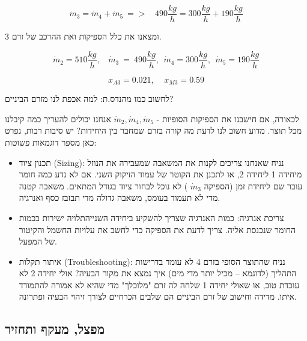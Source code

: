 \documentclass[
  hebrew,
  letterpaper,
  DIV=11,
  numbers=noendperiod]{scrreprt}
\begin{document}
\[{\dot{m}}_{3} = {\dot{m}}_{4} + {\dot{m}}_{5}\  = > \ \ \ \ 490\frac{kg}{h} = 300\frac{kg}{h} + 190\frac{kg}{h}\]

ומצאנו את כלל הספיקות ואת ההרכב של זרם 3.

\[{\dot{m}}_{2} = 510\frac{kg}{h},\ \ \ \ {\dot{m}}_{3}\  = \ 490\frac{kg}{h},\ \ {\dot{m}}_{4} = 300\frac{kg}{h},\ \ {\dot{m}}_{5} = 190\frac{kg}{h}\]

\[x_{A3} = 0.021,\ \ \ \ \ x_{M3} = 0.59\]

\begin{tcolorbox}[enhanced jigsaw, colback=white, arc=.35mm, coltitle=black, breakable, toptitle=1mm, leftrule=.75mm, colbacktitle=quarto-callout-tip-color!10!white, opacitybacktitle=0.6, bottomtitle=1mm, titlerule=0mm, opacityback=0, colframe=quarto-callout-tip-color-frame, title=\textcolor{quarto-callout-tip-color}{\faLightbulb}\hspace{0.5em}{עצה}, rightrule=.15mm, bottomrule=.15mm, toprule=.15mm, left=2mm]

לחשוב כמו מהנדס.ת: למה אכפת לנו מזרם הביניים?

לכאורה, אם חישבנו את הספיקות הסופיות -
\({\dot{m}}_{2},{\dot{m}}_{4},{\dot{m}}_{5}\) אנחנו יכולים להעריך כמה
קיבלנו מכל תוצר. מדוע חשוב לנו לדעת מה קורה בזרם שמחבר בין היחידות? יש
סיבות רבות, נפרט כאן מספר דוגמאות פשוטות:

\begin{itemize}
\item
  תכנון ציוד (Sizing): נניח שאנחנו צריכים לקנות את המשאבה שמעבירה את
  הנוזל מיחידה 1 ליחידה 2, או לתכנן את הקוטר של עמוד הזיקוק השני. אם לא
  נדע כמה חומר עובר שם ליחידת זמן (הספיקה \({\dot{m}}_{3}\) ) לא נוכל
  לבחור ציוד בגודל המתאים. משאבה קטנה מדי לא תעמוד בעומס, משאבה גדולה
  מדי תבזבז כסף ואנרגיה.
\item
  צריכת אנרגיה: כמות האנרגיה שצריך להשקיע ביחידה השנייהתלויה ישירות
  בכמות החומר שנכנסת אליה. צריך לדעת את הספיקה כדי לחשב את עלויות החשמל
  והקיטור של המפעל.
\item
  איתור תקלות (Troubleshooting): נניח שהתוצר הסופי בזרם 4 לא עומד
  בדרישות התהליך (לדוגמא -- מכיל יותר מדי מים) איך נמצא את מקור הבעיה?
  אולי יחידה 2 לא עובדת טוב, או שאולי יחידה 1 שלחה לה זרם "מלוכלך" מדי
  שהיא לא אמורה להתמודד איתו. מדידה וחישוב של זרם הביניים הם שלבים
  הכרחיים לצורך זיהוי הבעיה ופתרונה.
\end{itemize}

\end{tcolorbox}

\subsection{מפצל, מעקף
ותחזיר}\label{ux5deux5e4ux5e6ux5dc-ux5deux5e2ux5e7ux5e3-ux5d5ux5eaux5d7ux5d6ux5d9ux5e8}
\end{document}
